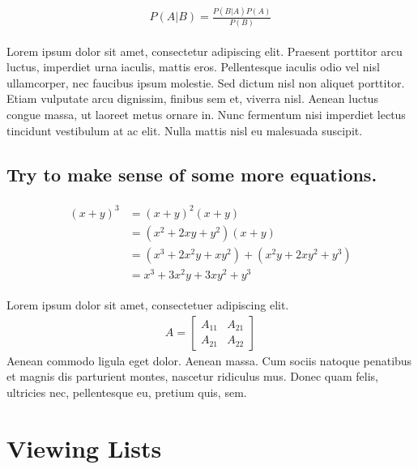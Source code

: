 \documentclass[11pt]{scrartcl} %
\begin{document}
{\begin{align}
	\label{eq:bayes}
	\begin{split}
		P(A|B) = \frac{P(B|A)P(A)}{P(B)}
	\end{split}
\end{align}

Lorem ipsum dolor sit amet, consectetur adipiscing elit. Praesent porttitor arcu luctus, imperdiet urna iaculis, mattis eros. Pellentesque iaculis odio vel nisl ullamcorper, nec faucibus ipsum molestie. Sed dictum nisl non aliquet porttitor. Etiam vulputate arcu dignissim, finibus sem et, viverra nisl. Aenean luctus congue massa, ut laoreet metus ornare in. Nunc fermentum nisi imperdiet lectus tincidunt vestibulum at ac elit. Nulla mattis nisl eu malesuada suscipit.


\subsection{Try to make sense of some more equations.}

\begin{align}
	\begin{split}
		(x+y)^3 &= (x+y)^2(x+y)\\
		&=(x^2+2xy+y^2)(x+y)\\
		&=(x^3+2x^2y+xy^2) + (x^2y+2xy^2+y^3)\\
		&=x^3+3x^2y+3xy^2+y^3
	\end{split}
\end{align}

Lorem ipsum dolor sit amet, consectetuer adipiscing elit.
\begin{align}
	A =
	\begin{bmatrix}
		A_{11} & A_{21} \\
		A_{21} & A_{22}
	\end{bmatrix}
\end{align}
Aenean commodo ligula eget dolor. Aenean massa. Cum sociis natoque penatibus et magnis dis parturient montes, nascetur ridiculus mus. Donec quam felis, ultricies nec, pellentesque eu, pretium quis, sem.


\section{Viewing Lists}

}
\end{document}
